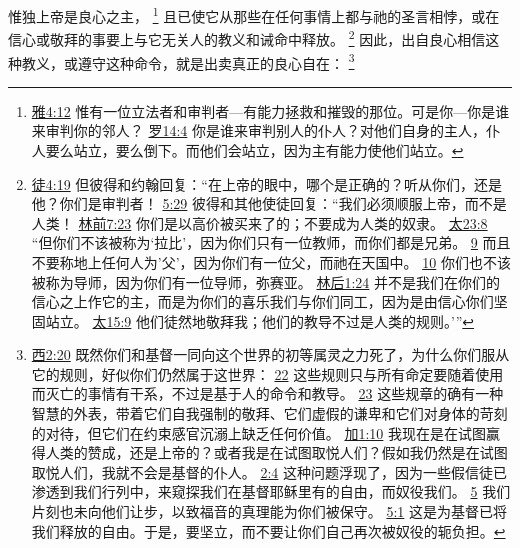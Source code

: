 \documentclass[12pt, a4paper, oneside]{ctexart}
\newcounter{parnum}[section]
\newcommand{\N}{%
   \noindent\refstepcounter{parnum}%
    \makebox[\parindent][l]{\textbf{\arabic{parnum}.}}}
\begin{document}
\N 惟独上帝是良心之主，
	\footnote {
		\href{https://biblehub.com/james/4-12.htm}{雅4:12} 惟有一位立法者和审判者---有能力拯救和摧毁的那位。可是你---你是谁来审判你的邻人？
		\href{https://biblehub.com/romans/14-4.htm}{罗14:4} 你是谁来审判别人的仆人？对他们自身的主人，仆人要么站立，要么倒下。而他们会站立，因为主有能力使他们站立。
	}
	且已使它从那些在任何事情上都与祂的圣言相悖，或在信心或敬拜的事要上与它无关人的教义和诫命中释放。
	\footnote {
		\href{https://biblehub.com/acts/4-19.htm}{徒4:19} 但彼得和约翰回复：“在上帝的眼中，哪个是正确的？听从你们，还是他？你们是审判者！
		\href{https://biblehub.com/acts/5-29.htm}{5:29} 彼得和其他使徒回复：“我们必须顺服上帝，而不是人类！ \href{https://biblehub.com/1_corinthians/7-23.htm}{林前7:23} 你们是以高价被买来了的；不要成为人类的奴隶。
		\href{https://biblehub.com/matthew/23-8.htm}{太23:8} “但你们不该被称为‘拉比’，因为你们只有一位教师，而你们都是兄弟。
		\href{https://biblehub.com/matthew/23-9.htm}{9} 而且不要称地上任何人为'父'，因为你们有一位父，而祂在天国中。
		\href{https://biblehub.com/matthew/23-10.htm}{10} 你们也不该被称为导师，因为你们有一位导师，弥赛亚。
		\href{https://biblehub.com/2_corinthians/1-24.htm}{林后1:24} 并不是我们在你们的信心之上作它的主，而是为你们的喜乐我们与你们同工，因为是由信心你们坚固站立。
		\href{https://biblehub.com/matthew/15-9.htm}{太15:9} 他们徒然地敬拜我；他们的教导不过是人类的规则。’”
	}
	因此，出自良心相信这种教义，或遵守这种命令，就是出卖真正的良心自在：
	\footnote {
		\href{https://biblehub.com/colossians/2-20.htm}{西2:20} 既然你们和基督一同向这个世界的初等属灵之力死了，为什么你们服从它的规则，好似你们仍然属于这世界：
		\href{https://biblehub.com/colossians/2-22.htm}{22} 这些规则只与所有命定要随着使用而灭亡的事情有干系，不过是基于人的命令和教导。
		\href{https://biblehub.com/colossians/2-23.htm}{23} 这些规章的确有一种智慧的外表，带着它们自我强制的敬拜、它们虚假的谦卑和它们对身体的苛刻的对待，但它们在约束感官沉溺上缺乏任何价值。
		\href{https://biblehub.com/galatians/1-10.htm}{加1:10} 我现在是在试图赢得人类的赞成，还是上帝的？或者我是在试图取悦人们？假如我仍然是在试图取悦人们，我就不会是基督的仆人。
		\href{https://biblehub.com/galatians/2-4.htm}{2:4} 这种问题浮现了，因为一些假信徒已渗透到我们行列中，来窥探我们在基督耶稣里有的自由，而奴役我们。
		\href{https://biblehub.com/galatians/2-5.htm}{5} 我们片刻也未向他们让步，以致福音的真理能为你们被保守。
		\href{https://biblehub.com/galatians/5-1.htm}{5:1} 这是为基督已将我们释放的自由。于是，要坚立，而不要让你们自己再次被奴役的轭负担。
	}
\end{document}
